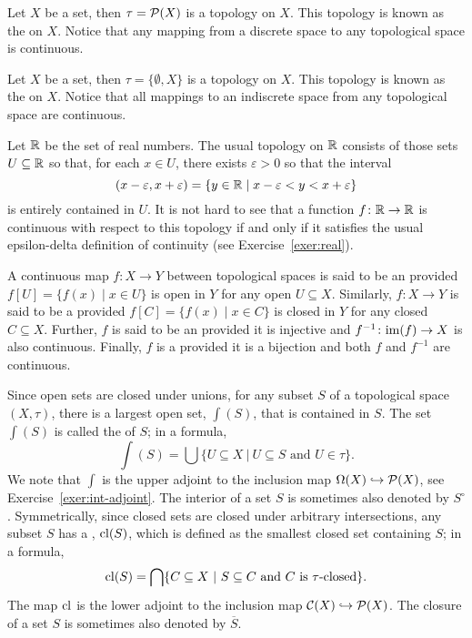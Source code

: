 \begin{example}
Let $X$ be a set, then $\tau=\mathcal{P}(X)$ is a topology on $X$.  This topology is known as the  on $X$. Notice that any mapping from a discrete space to any topological space is continuous.
\end{example}

\begin{example}
Let $X$ be a set, then $\tau=\{\emptyset,X\}$  is a topology on $X$.  This topology is known as the  on $X$. Notice that all mappings to an indiscrete space from any topological space are continuous.
\end{example}

\begin{example}\label{exp:real}
Let $\mathbb{R}$ be the set of real numbers. The usual topology on $\mathbb{R}$ consists of those sets $U\subseteq\mathbb{R}$ so that, for each $x\in U$, there exists $\varepsilon>0$ so that the interval
\[
(x-\varepsilon,x+\varepsilon)=\{y\in\mathbb{R}\mid x-\varepsilon<y<x+\varepsilon\}
\]
is entirely contained in $U$. It is not hard to see that a function $f\colon\mathbb{R}\to\mathbb{R}$ is continuous with respect to this topology if and only if it satisfies the usual epsilon-delta definition of continuity (see Exercise~\ref{exer:real}).
\end{example}

A continuous map $f\colon X\to Y$ between topological spaces is said to be an  provided $f[U]=\{f(x)\mid x\in U\}$ is open in $Y$ for any open $U\subseteq X$. Similarly,  $f\colon X\to Y$ is said to be a  provided $f[C]=\{f(x)\mid x\in C\}$ is closed in $Y$ for any closed $C\subseteq X$. Further, $f$ is said to be an  provided it is injective and $f^{-1}\colon\mathrm{im}(f)\to X$ is also continuous. Finally, $f$ is a  provided it is a bijection and both $f$ and $f^{-1}$ are continuous.

Since open sets are closed under unions, for any subset $S$ of a topological space $(X, \tau)$, there is a largest open set, $\int(S)$, that is contained in $S$. The set $\int(S)$ is called the  of $S$; in a formula, 
\[\int(S) = \bigcup\{U \subseteq X \ | \ U \subseteq S \text{ and } U \in \tau\}.\] 
We note that $\int$ is the upper adjoint to the inclusion map $\Omega(X) \hookrightarrow \mathcal{P}(X)$, see Exercise~\ref{exer:int-adjoint}. The interior of a set $S$ is sometimes also denoted by $S^\circ$.
Symmetrically, since closed sets are closed under arbitrary intersections, any subset $S$ has a , $\mathrm{cl}(S)$, which is defined as the smallest closed set containing $S$; in a formula, 
\[\mathrm{cl}(S) = \bigcap \{C\subseteq X \ | \ S \subseteq C\text{ and } C\text{ is } \tau\text{-closed}\}.\] 
The map $\mathrm{cl}$ is the lower adjoint to the inclusion map $\mathcal{C}(X) \hookrightarrow \mathcal{P}(X)$. The closure of a set $S$ is sometimes also denoted by $\overline{S}$.

